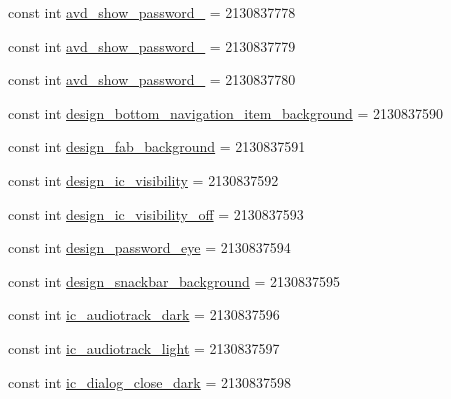 \begin{DoxyCompactItemize}
\item 
const int \mbox{\hyperlink{class_f_w_p_s___app_1_1_droid_1_1_resource_1_1_drawable_a4a289f6d221c6c329b926e1a4ffc4dd4}{avd\+\_\+show\+\_\+password\+\_}} = 2130837778
\item 
const int \mbox{\hyperlink{class_f_w_p_s___app_1_1_droid_1_1_resource_1_1_drawable_a812d89c7b914928818eef40d8ce79017}{avd\+\_\+show\+\_\+password\+\_}} = 2130837779
\item 
const int \mbox{\hyperlink{class_f_w_p_s___app_1_1_droid_1_1_resource_1_1_drawable_ad1b23075ed8159dc8586ee16530f222b}{avd\+\_\+show\+\_\+password\+\_}} = 2130837780
\item 
const int \mbox{\hyperlink{class_f_w_p_s___app_1_1_droid_1_1_resource_1_1_drawable_a95b79aba299807701ca8fdfaca9c36fe}{design\+\_\+bottom\+\_\+navigation\+\_\+item\+\_\+background}} = 2130837590
\item 
const int \mbox{\hyperlink{class_f_w_p_s___app_1_1_droid_1_1_resource_1_1_drawable_af3df1c2a87c028cab5c009d48102a3df}{design\+\_\+fab\+\_\+background}} = 2130837591
\item 
const int \mbox{\hyperlink{class_f_w_p_s___app_1_1_droid_1_1_resource_1_1_drawable_ad48ae606726e5aec3cfbe676d1af7e69}{design\+\_\+ic\+\_\+visibility}} = 2130837592
\item 
const int \mbox{\hyperlink{class_f_w_p_s___app_1_1_droid_1_1_resource_1_1_drawable_a0aa6dc32ea2cd4458bd61cc92d0f4ff2}{design\+\_\+ic\+\_\+visibility\+\_\+off}} = 2130837593
\item 
const int \mbox{\hyperlink{class_f_w_p_s___app_1_1_droid_1_1_resource_1_1_drawable_a83de6bb4ae0b0fc647253be8e783de56}{design\+\_\+password\+\_\+eye}} = 2130837594
\item 
const int \mbox{\hyperlink{class_f_w_p_s___app_1_1_droid_1_1_resource_1_1_drawable_a439acdbcc5fef08e1ae47a4dd45f27c7}{design\+\_\+snackbar\+\_\+background}} = 2130837595
\item 
const int \mbox{\hyperlink{class_f_w_p_s___app_1_1_droid_1_1_resource_1_1_drawable_af0ae7cb74dbc0b9aef635051b9d35782}{ic\+\_\+audiotrack\+\_\+dark}} = 2130837596
\item 
const int \mbox{\hyperlink{class_f_w_p_s___app_1_1_droid_1_1_resource_1_1_drawable_a53ce8e074a85f1218e2a0d6fcc14a038}{ic\+\_\+audiotrack\+\_\+light}} = 2130837597
\item 
const int \mbox{\hyperlink{class_f_w_p_s___app_1_1_droid_1_1_resource_1_1_drawable_ab875148b9a246f4dd53b7602244d7cd1}{ic\+\_\+dialog\+\_\+close\+\_\+dark}} = 2130837598
\item 

\end{DoxyCompactItemize}
